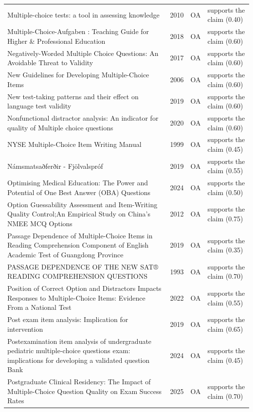 \begin{longtable}{@{}%
  >{\raggedright\arraybackslash}p{}c%
  >{\raggedright\arraybackslash}p{}%
  >{\raggedright\arraybackslash}p{}@{}}
Multiple-choice tests: a tool in assessing knowledge & 2010 & OA & supports the claim (0.40) \\
Multiple-Choice-Aufgaben : Teaching Guide for Higher \& Professional Education & 2018 & OA & supports the claim (0.60) \\
Negatively-Worded Multiple Choice Questions: An Avoidable Threat to Validity & 2017 & OA & supports the claim (0.60) \\
New Guidelines for Developing Multiple-Choice Items & 2006 & OA & supports the claim (0.60) \\
New test-taking patterns and their effect on language test validity & 2019 & OA & supports the claim (0.60) \\
Nonfunctional distractor analysis: An indicator for quality of Multiple choice questions & 2020 & OA & supports the claim (0.60) \\
NYSE Multiple-Choice Item Writing Manual & 1999 & OA & supports the claim (0.45) \\
Námsmatsaðferðir - Fjölvalspróf & 2019 & OA & supports the claim (0.55) \\
Optimising Medical Education: The Power and Potential of One Best Answer (OBA) Questions & 2024 & OA & supports the claim (0.50) \\
Option Guessability Assessment and Item-Writing Quality Control;An Empirical Study on China's NMEE MCQ Options & 2012 & OA & supports the claim (0.75) \\
Passage Dependence of Multiple-Choice Items in Reading Comprehension Component of English Academic Test of Guangdong Province & 2019 & OA & supports the claim (0.35) \\
PASSAGE DEPENDENCE OF THE NEW SAT® READING COMPREHENSION QUESTIONS & 1993 & OA & supports the claim (0.70) \\
Position of Correct Option and Distractors Impacts Responses to Multiple-Choice Items: Evidence From a National Test & 2022 & OA & supports the claim (0.55) \\
Post exam item analysis: Implication for intervention & 2019 & OA & supports the claim (0.65) \\
Postexamination item analysis of undergraduate pediatric multiple-choice questions exam: implications for developing a validated question Bank & 2024 & OA & supports the claim (0.45) \\
Postgraduate Clinical Residency: The Impact of Multiple-Choice Question Quality on Exam Success Rates & 2025 & OA & supports the claim (0.70) \\

\end{longtable}
